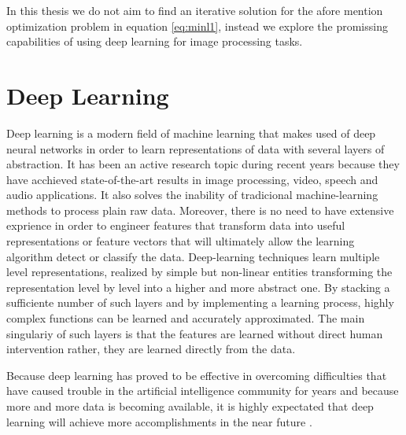 In this thesis we do not aim to find an iterative solution for the afore mention optimization problem in equation \ref{eq:minl1}, instead we explore the promissing capabilities of using deep learning for image processing tasks.

   
\section{Deep Learning}
Deep learning is a modern field of machine learning that makes used of deep neural networks in order to learn representations of data with several layers of abstraction. It has been an active research topic during recent years because they have acchieved state-of-the-art results in image processing, video, speech and audio applications. It also solves the inability of tradicional machine-learning methods to process plain raw data. Moreover, there is no need to have extensive exprience in order to engineer features that transform data into useful representations or feature vectors that will ultimately allow the learning algorithm detect or classify the data. Deep-learning techniques learn multiple level representations, realized by simple but non-linear entities transforming the representation level by level into a higher and more abstract one. By stacking a sufficiente number of such layers and by implementing a learning process, highly complex functions can be learned and accurately approximated. The main singulariy of such layers is that the features are learned without direct human intervention rather, they are learned directly from the data.   \   

Because deep learning has proved to be effective in overcoming difficulties that have caused trouble in the artificial intelligence community for years and because more and more data is becoming available, it is highly expectated that deep learning will achieve more accomplishments in the near future \cite{lecun2015deep}.          
